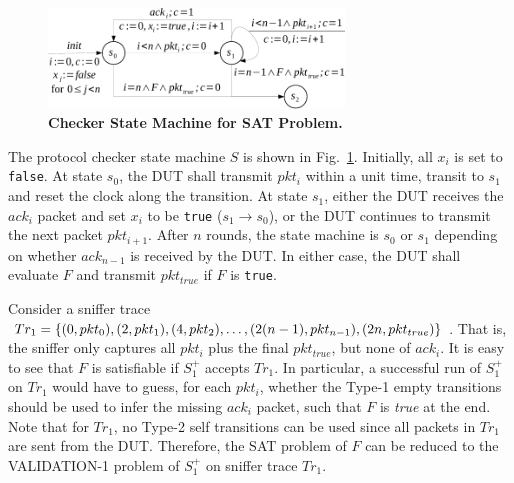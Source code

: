\begin{figure}[h!]
  \centering
  \includegraphics[width=0.7\textwidth]{./figures/sat_sm.pdf}
  \caption{\textbf{Checker State Machine for SAT Problem.}}
  \label{fig:sat}
\end{figure}



The protocol checker state machine $S$ is shown in Fig.~\ref{fig:sat}.
%
Initially, all $x_i$ is set to \texttt{false}.
%
At state $s_0$, the DUT shall transmit $pkt_i$ within a unit time, transit to
$s_1$ and reset the clock along the transition.
At state $s_1$, either the DUT receives the $ack_i$ packet and
set $x_i$ to be \texttt{true} ($s_1 \rightarrow s_0$), or the DUT continues to
transmit the next packet $pkt_{i+1}$.
%
After $n$ rounds, the state machine is $s_0$ or $s_1$ depending on whether
$ack_{n-1}$ is received by the DUT.
%
In either case, the DUT shall evaluate $F$ and transmit $pkt_{true}$ if $F$ is
\texttt{true}.  

Consider a sniffer trace $Tr_1=\{(0, pkt_0), (2, pkt_1),\\ (4,
pkt_2),\ldots, (2(n-1), pkt_{n-1}), (2n, pkt_{true})\}$.
%
That is, the sniffer only captures all $pkt_i$ plus the final $pkt_{true}$, but none of
$ack_i$.
%
It is easy to see that $F$ is satisfiable if $S_1^+$ accepts
$Tr_1$.
%
In particular, a successful run of $S_1^+$ on $Tr_1$ would have to
guess, for each $pkt_i$, whether the Type-1 empty transitions should be used
to infer the missing $ack_i$ packet, such that $F$ is \textit{true} at the
end.
%
Note that for $Tr_1$, no Type-2 self transitions can be used since all
packets in $Tr_1$ are sent from the DUT.
%
Therefore, the SAT problem of $F$ can be reduced to the VALIDATION-1 problem
of $S^+_1$ on sniffer trace $Tr_1$.


